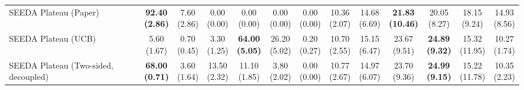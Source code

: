 \begin{table}[H]
{\begin{tabular}{l|cccccc|cccccc}
SEEDA Plateau (Paper) & \bfseries \makecell{92.40 \\ (2.86)} & \makecell{7.60 \\ (2.86)} & {\cellcolor[HTML]{C8E6C9}} \makecell{0.00 \\ (0.00)} & \makecell{0.00 \\ (0.00)} & \makecell{0.00 \\ (0.00)} & \makecell{0.00 \\ (0.00)} & \makecell{10.36 \\ (2.07)} & \makecell{14.68 \\ (6.69)} & {\cellcolor[HTML]{C8E6C9}} \bfseries \makecell{21.83 \\ (10.46)} & \makecell{20.05 \\ (8.27)} & \makecell{18.15 \\ (9.24)} & \makecell{14.93 \\ (8.56)} \\
SEEDA Plateau (UCB) & \makecell{5.60 \\ (1.67)} & \makecell{0.70 \\ (0.45)} & {\cellcolor[HTML]{C8E6C9}} \makecell{3.30 \\ (1.25)} & \bfseries \makecell{64.00 \\ (5.05)} & \makecell{26.20 \\ (5.02)} & \makecell{0.20 \\ (0.27)} & \makecell{10.70 \\ (2.55)} & \makecell{15.15 \\ (6.47)} & {\cellcolor[HTML]{C8E6C9}} \makecell{23.67 \\ (9.51)} & \bfseries \makecell{24.89 \\ (9.32)} & \makecell{15.32 \\ (11.95)} & \makecell{10.27 \\ (1.74)} \\
SEEDA Plateau (Two-sided, decoupled) & \bfseries \makecell{68.00 \\ (0.71)} & \makecell{3.60 \\ (1.64)} & {\cellcolor[HTML]{C8E6C9}} \makecell{13.50 \\ (2.32)} & \makecell{11.10 \\ (1.85)} & \makecell{3.80 \\ (2.02)} & \makecell{0.00 \\ (0.00)} & \makecell{10.77 \\ (2.67)} & \makecell{14.97 \\ (6.07)} & {\cellcolor[HTML]{C8E6C9}} \makecell{23.70 \\ (9.36)} & \bfseries \makecell{24.99 \\ (9.15)} & \makecell{15.22 \\ (11.78)} & \makecell{10.35 \\ (2.23)} \\

\end{tabular}}
\end{table}
